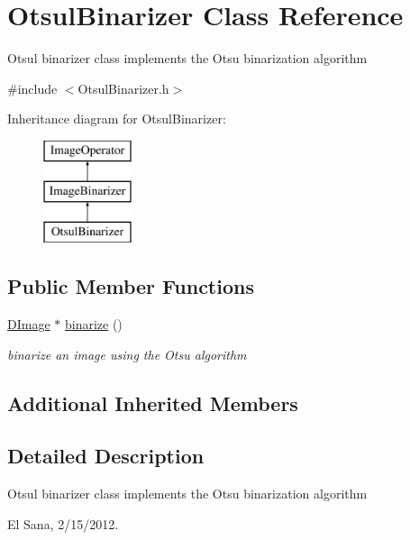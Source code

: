 \hypertarget{class_otsul_binarizer}{\section{Otsul\+Binarizer Class Reference}
\label{class_otsul_binarizer}
}


Otsul binarizer class implements the Otsu binarization algorithm  




{\ttfamily \#include $<$Otsul\+Binarizer.\+h$>$}

Inheritance diagram for Otsul\+Binarizer\+:\begin{figure}[H]
\begin{center}
\leavevmode
\includegraphics[height=3.000000cm]{class_otsul_binarizer}
\end{center}
\end{figure}
\subsection*{Public Member Functions}
\begin{DoxyCompactItemize}
\item 
\hyperlink{class_d_image}{D\+Image} $\ast$ \hyperlink{class_otsul_binarizer_a14064c86e424c1e68625b7fbc07195d5}{binarize} ()
\begin{DoxyCompactList}\small\item\em binarize an image using the Otsu algorithm \end{DoxyCompactList}\end{DoxyCompactItemize}
\subsection*{Additional Inherited Members}


\subsection{Detailed Description}
Otsul binarizer class implements the Otsu binarization algorithm 

El Sana, 2/15/2012. 

